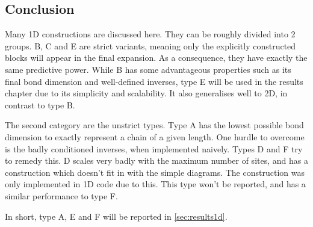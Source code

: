 \subsection{Conclusion}

Many 1D constructions are discussed here. They can be roughly divided into 2 groups. B, C and E are strict variants, meaning only the explicitly constructed blocks will appear in the final expansion. As a consequence, they have exactly the same predictive power. While B has some advantageous properties such as its final bond dimension and well-defined inverses, type E will be used in the results chapter due to its simplicity and scalability. It also generalises well to 2D, in contrast to type B.

The second category are the unstrict types. Type A has the lowest possible bond dimension to exactly represent a chain of a given length. One hurdle to overcome is the badly conditioned inverses, when implemented naively. Types D and F try to remedy this. D scales very badly with the maximum number of sites, and has a construction which doesn't fit in with the simple diagrams. The construction was only implemented in 1D code due to this. This type won't be reported, and has a similar performance to type F.

In short, type A, E and F will be reported in \cref{sec:results1d}.
